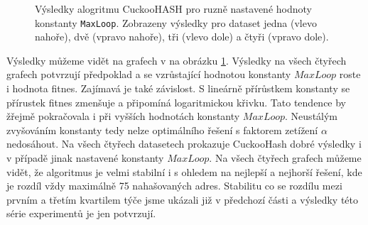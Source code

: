 \begin{figure}[!ht]
\caption{Výsledky alogritmu CuckooHASH pro ruzně nastavené hodnoty konstanty \texttt{MaxLoop}. Zobrazeny výsledky pro dataset jedna (vlevo nahoře),
	dvě (vpravo nahoře), tři (vlevo dole) a čtyři (vpravo dole).}
\label{fig:cuckoo_maxloop}
\end{figure}

Výsledky můžeme vidět na grafech v na obrázku \ref{fig:cuckoo_maxloop}. Výsledky na všech čtyřech grafech potvrzují předpoklad a se vzrůstající hodnotou
konstanty $MaxLoop$ roste i hodnota fitnes. Zajímavá je také závislost. S lineárně přírůstkem konstanty se přírustek fitnes zmenšuje a připomíná logaritmickou
křivku. Tato tendence by žřejmě pokračovala i při vyšších hodnotách konstanty $MaxLoop$. Neustálým zvyšováním konstanty tedy nelze optimálního řešení
s faktorem zetížení $\alpha$ nedosáhout. Na všech čtyřech datasetech prokazuje CuckooHash dobré výsledky i v případě jinak nastavené konstanty $MaxLoop$.
Na všech čtyřech grafech můžeme vidět, že algoritmus je velmi stabilní i s ohledem na nejlepší a nejhorší řešení, kde je rozdíl vždy maximálně 75 nahašovaných 
adres. Stabilitu co se rozdílu mezi prvním a třetím kvartilem týče jsme ukázali již v předchozí části a výsledky této série experimentů je jen potvrzují.

